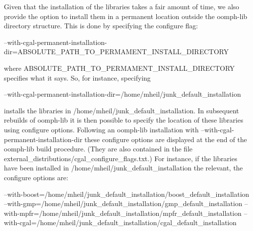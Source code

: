 Given that the installation of the libraries takes a fair amount of time, we also provide the option to install them in a permanent location outside the {\ttfamily oomph-\/lib} directory structure. This is done by specifying the configure flag\+: 
\begin{DoxyCode}
--with-cgal-permanent-installation-dir=ABSOLUTE\_PATH\_TO\_PERMAMENT\_INSTALL\_DIRECTORY
\end{DoxyCode}
 where {\ttfamily A\+B\+S\+O\+L\+U\+T\+E\+\_\+\+P\+A\+T\+H\+\_\+\+T\+O\+\_\+\+P\+E\+R\+M\+A\+M\+E\+N\+T\+\_\+\+I\+N\+S\+T\+A\+L\+L\+\_\+\+D\+I\+R\+E\+C\+T\+O\+RY} specifies what it says. So, for instance, specifying 
\begin{DoxyCode}
--with-cgal-permanent-installation-dir=/home/mheil/junk\_default\_installation
\end{DoxyCode}
 installs the libraries in {\ttfamily /home/mheil/junk\+\_\+default\+\_\+installation}. In subsequent rebuilds of {\ttfamily oomph-\/lib} it is then possible to specify the location of these libraries using configure options. Following an {\ttfamily oomph-\/lib} installation with {\ttfamily --with-\/cgal-\/permanent-\/installation-\/dir} these configure options are displayed at the end of the {\ttfamily oomph-\/lib} build procedure. (They are also contained in the file {\ttfamily external\+\_\+distributions/cgal\+\_\+configure\+\_\+flags.\+txt}.) For instance, if the libraries have been installed in {\ttfamily /home/mheil/junk\+\_\+default\+\_\+installation} the relevant, the configure options are\+: 
\begin{DoxyCode}
--with-boost=/home/mheil/junk\_default\_installation/boost\_default\_installation
--with-gmp=/home/mheil/junk\_default\_installation/gmp\_default\_installation
--with-mpfr=/home/mheil/junk\_default\_installation/mpfr\_default\_installation
--with-cgal=/home/mheil/junk\_default\_installation/cgal\_default\_installation
\end{DoxyCode}


